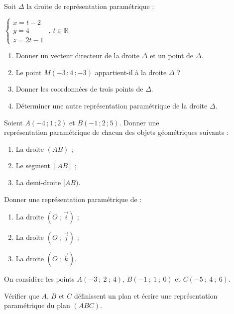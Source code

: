 \documentclass{cornouaille}
\begin{document}
\begin{exercice}
  Soit  $\Delta$ la droite de représentation paramétrique :

  \begin{center}
    $\begin{cases}x=t-2 \\y=4 \\z=2t-1 \end{cases}$ , $t\in\mathbb{R}$
  \end{center}

  \begin{enumerate}
  \item Donner un vecteur directeur de la droite $\Delta$ et un point
    de $\Delta$.
  \item Le point $M(-3\,;4\,;-3)$ appartient-il à la droite $\Delta$ ?
  \item Donner les coordonnées de trois points de $\Delta$.
  \item Déterminer une autre représentation paramétrique de la droite
    $\Delta$.
  \end{enumerate}
\end{exercice}

\begin{exercice}
  Soient $A(-4\,;1\,;2)$ et $B(-1\,;2\,;5)$. Donner une\\
  représentation paramétrique de chacun des objets géométriques
  suivants :
  \begin{enumerate}
  \item La droite $(AB)$ ;
  \item Le segment $[AB]$ ;
  \item La demi-droite $[AB)$.
  \end{enumerate}
\end{exercice}

\begin{exercice}
  Donner une représentation paramétrique de :
  \begin{enumerate}
  \item La droite $(O\ ;\ \overrightarrow{i})$ ;
  \item La droite $(O\ ;\ \overrightarrow{j})$ ;
  \item La droite $(O\ ;\ \overrightarrow{k})$.
  \end{enumerate}
\end{exercice}

\begin{exercice}
  On considère les points $A(-3\ ;\ 2\ ;\ 4)$, $B(-1\ ;\ 1\ ;\ 0)$ et
  $C(-5\ ;\ 4\ ;\ 6)$.

  Vérifier que $A$, $B$ et $C$ définissent un plan et écrire une
  représentation paramétrique du plan $(ABC)$.
\end{exercice}
\end{document}
